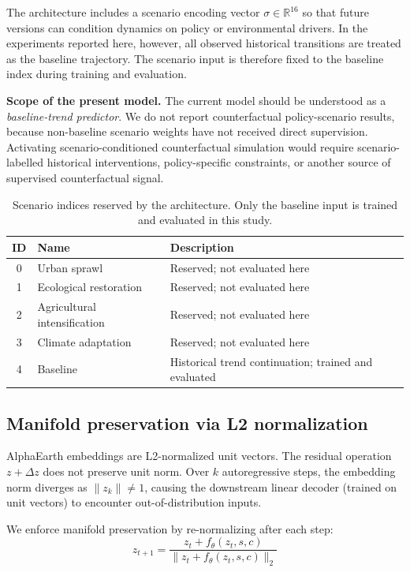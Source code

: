 \documentclass{article}
\begin{document}
The architecture includes a scenario encoding vector $\sigma \in \mathbb{R}^{16}$ so that future versions can condition dynamics on policy or environmental drivers. In the experiments reported here, however, all observed historical transitions are treated as the baseline trajectory. The scenario input is therefore fixed to the baseline index during training and evaluation.

\textbf{Scope of the present model.} The current model should be understood as a \textit{baseline-trend predictor}. We do not report counterfactual policy-scenario results, because non-baseline scenario weights have not received direct supervision. Activating scenario-conditioned counterfactual simulation would require scenario-labelled historical interventions, policy-specific constraints, or another source of supervised counterfactual signal.

\begin{table}[htbp]
\centering
\caption{Scenario indices reserved by the architecture. Only the baseline input is trained and evaluated in this study.}
\label{tab:scenarios}
\small
\begin{tabular}{clp{}}
\toprule
ID & Name & Description \\
\midrule
0 & Urban sprawl & Reserved; not evaluated here \\
1 & Ecological restoration & Reserved; not evaluated here \\
2 & Agricultural intensification & Reserved; not evaluated here \\
3 & Climate adaptation & Reserved; not evaluated here \\
4 & Baseline & Historical trend continuation; trained and evaluated \\
\bottomrule
\end{tabular}
\end{table}

\subsection{Manifold preservation via L2 normalization}
\label{sec:manifold}

AlphaEarth embeddings are L2-normalized unit vectors. The residual operation $z + \Delta z$ does not preserve unit norm. Over $k$ autoregressive steps, the embedding norm diverges as $\|z_k\| \neq 1$, causing the downstream linear decoder (trained on unit vectors) to encounter out-of-distribution inputs.

We enforce manifold preservation by re-normalizing after each step:
\begin{equation}
z_{t+1} = \frac{z_t + f_\theta(z_t, s, c)}{\|z_t + f_\theta(z_t, s, c)\|_2}
\end{equation}
\end{document}
